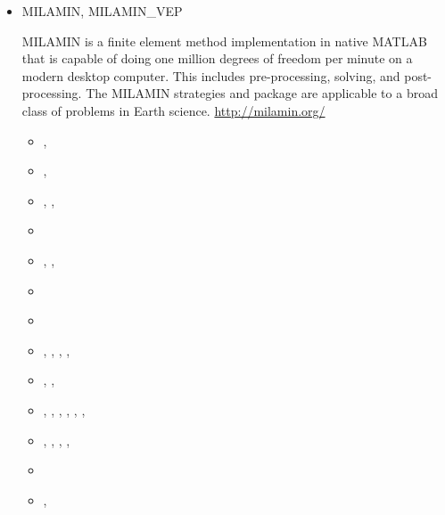 \begin{itemize}
\begin{scriptsize}
\begin{itemize}
\item[1997] \textcite{nesg97}
\item[1999] \textcite{nesb99}
\end{itemize}
\end{scriptsize}

\item {\codefont MILAMIN, MILAMIN\_VEP} 

MILAMIN is a finite element method implementation in native MATLAB that is capable 
of doing one million degrees of freedom per minute on a modern desktop computer. 
This includes pre-processing, solving, and post-processing. The MILAMIN strategies and 
package are applicable to a broad class of problems in Earth science. \url{http://milamin.org/}

\begin{scriptsize}
\begin{itemize}
\item[\twothousandeight]     \textcite{daks08},  \textcite{scdk08}
\item[\twothousandnine]      \textcite{gogk09},  \textcite{kalb09}
\item[\twothousandten]       \textcite{krda10},  \textcite{kaus10},  \textcite{dekc10}
\item[\twothousandeleven]    \textcite{yakm11}
\item[\twothousandtwelve]    \textcite{gebk12},  \textcite{rukb12},  \textcite{thka12}
\item[\twothousandthirteen]  \textcite{scpo13}
\item[\twothousandfourteen]  \textcite{jobk14}
\item[\twothousandfifteen]   \textcite{lukz15},  \textcite{gehm15},  \textcite{baka15}, 
                             \textcite{thkp15},  \textcite{musd15}
\item[\twothousandsixteen]   \textcite{jads16},  \textcite{maka16},  \textcite{cakp16}
\item[\twothousandeighteen]  \textcite{dusd18},  \textcite{jasc18},  \textcite{jadg18},
                             \textcite{comj18},  \textcite{jens18},  \textcite{rabw18},
                             \textcite{chsm18}
\item[\twothousandnineteen]  \textcite{sifg19},  \textcite{baba19},  \textcite{peaa20},
                             \textcite{sogh19},  \textcite{anpa19}
\item[\twothousandtwenty]    \textcite{hube20}
\item[\twothousandtwentythree] \textcite{lilm23}, \textcite{rapa23} 
\end{itemize}
\end{scriptsize}


\end{itemize}
